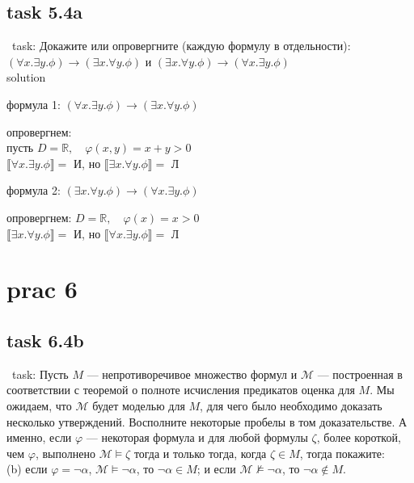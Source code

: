\documentclass[12pt]{article}
\begin{document}
\subsection*{task 5.4a}

\quad\ task: Докажите или опровергните (каждую формулу в отдельности): $(\forall x.\exists y.\phi) \rightarrow (\exists x.\forall y.\phi)$ и
$(\exists x.\forall y.\phi) \rightarrow (\forall x.\exists y.\phi)$\\

solution

формула 1: $(\forall x.\exists y.\phi) \rightarrow (\exists x.\forall y.\phi)$

опровергнем:\\
пусть $D=\mathbb{R},\quad \varphi(x,y) = x + y > 0$\\
$\llbracket \forall x.\exists y.\phi \rrbracket=$ И, но $\llbracket \exists x.\forall y.\phi \rrbracket=$ Л

формула 2: $(\exists x.\forall y.\phi) \rightarrow (\forall x.\exists y.\phi)$

опровергнем: $D=\mathbb{R},\quad \varphi(x) = x > 0$\\
$\llbracket \exists x.\forall y.\phi \rrbracket=$ И, но $\llbracket \forall x.\exists y.\phi \rrbracket=$ Л

\section*{prac 6}

\subsection*{task 6.4b}

\quad\ task: Пусть $M$ --- непротиворечивое множество формул и $\mathcal{M}$ --- построенная в соответствии с теоремой о 
полноте исчисления предикатов оценка для $M$. Мы ожидаем, что $\mathcal{M}$ будет моделью для $M$, для чего было необходимо доказать
несколько утверждений. Восполните некоторые пробелы в том доказательстве. А именно, если $\varphi$ --- 
некоторая формула и для любой формулы $\zeta$, более короткой, чем $\varphi$, выполнено
$\mathcal{M}\models\zeta$ тогда и только тогда, когда $\zeta\in M$, тогда покажите:\\
(b) если $\varphi = \neg\alpha$, $\mathcal{M}\models\neg\alpha$, то $\neg\alpha\in M$; и если $\mathcal{M}\not\models\neg\alpha$, то $\neg\alpha\notin M$.\\
\end{document}
